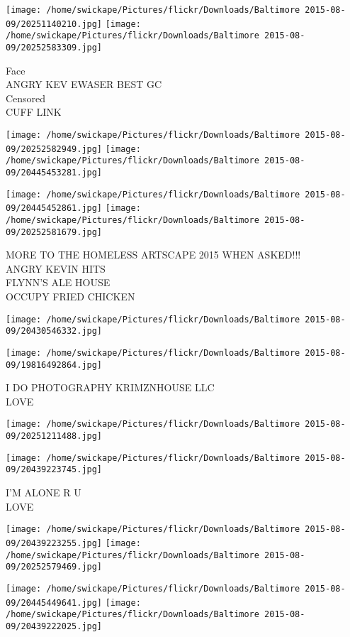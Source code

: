 \documentclass[10pt,letterpaper]{article}
\begin{document}
\texttt{[image: /home/swickape/Pictures/flickr/Downloads/Baltimore 2015-08-09/20251140210.jpg]}
\texttt{[image: /home/swickape/Pictures/flickr/Downloads/Baltimore 2015-08-09/20252583309.jpg]}

Face\\
ANGRY KEV EWASER BEST GC\\
Censored\\
CUFF LINK
\pagebreak

\texttt{[image: /home/swickape/Pictures/flickr/Downloads/Baltimore 2015-08-09/20252582949.jpg]}
\texttt{[image: /home/swickape/Pictures/flickr/Downloads/Baltimore 2015-08-09/20445453281.jpg]}

\texttt{[image: /home/swickape/Pictures/flickr/Downloads/Baltimore 2015-08-09/20445452861.jpg]}
\texttt{[image: /home/swickape/Pictures/flickr/Downloads/Baltimore 2015-08-09/20252581679.jpg]}

MORE TO THE HOMELESS ARTSCAPE 2015 WHEN ASKED!!!\\
ANGRY KEVIN HITS\\
FLYNN'S ALE HOUSE\\
OCCUPY FRIED CHICKEN
\pagebreak

\texttt{[image: /home/swickape/Pictures/flickr/Downloads/Baltimore 2015-08-09/20430546332.jpg]}

\vspace{0.25in}
\texttt{[image: /home/swickape/Pictures/flickr/Downloads/Baltimore 2015-08-09/19816492864.jpg]}

I DO PHOTOGRAPHY KRIMZNHOUSE LLC\\
LOVE
\pagebreak

\texttt{[image: /home/swickape/Pictures/flickr/Downloads/Baltimore 2015-08-09/20251211488.jpg]}

\vspace{0.25in}
\texttt{[image: /home/swickape/Pictures/flickr/Downloads/Baltimore 2015-08-09/20439223745.jpg]}

I'M ALONE R U\\
LOVE
\pagebreak

\texttt{[image: /home/swickape/Pictures/flickr/Downloads/Baltimore 2015-08-09/20439223255.jpg]}
\texttt{[image: /home/swickape/Pictures/flickr/Downloads/Baltimore 2015-08-09/20252579469.jpg]}

\texttt{[image: /home/swickape/Pictures/flickr/Downloads/Baltimore 2015-08-09/20445449641.jpg]}
\texttt{[image: /home/swickape/Pictures/flickr/Downloads/Baltimore 2015-08-09/20439222025.jpg]}
\end{document}
